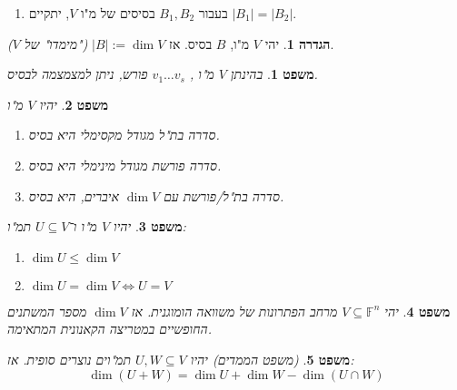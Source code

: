 \documentclass[]{article}
\newcommand\F         {\mathbb{F}}
\newtheorem{Theorem}{משפט}
\theoremstyle{definition}
\newtheorem{definition}{הגדרה}
\newcommand\theo  [1] {\begin{Theorem}#1\end{Theorem}}
\newcommand\defi  [1] {\begin{definition}#1\end{definition}}
\begin{document}
\begin{multicols}{2}
{\begin{enumerate}
			\item בעבור $B_1, B_2$ בסיסים של מ"ו $V$, יתקיים $|B_1| = |B_2|$. 
		\end{enumerate}} 
		\defi{יהי $V$ מ"ו, $B$ בסיס. אז $|B| := \dim V$ \textit{("מימדו" של $V$)}. }
		\theo{בהינתן $V$ מ"ו , $v_1 \dots v_s$ פורש, ניתן למצמצמה לבסיס. }
		\theo{יהיו $V$ מ"ו
		\begin{enumerate}
			\item סדרה בת"ל מגודל מקסימלי היא בסיס. 
			\item סדרה פורשת מגודל מינימלי היא בסיס. 
			\item סדרה בת"ל/פורשת עם $\dim V$ איברים, היא בסיס. 
		\end{enumerate}}
		\theo{יהיו $V$ מ"ו ו־$U\subseteq V$ תמ"ו: 
		\begin{enumerate}
			\item $\dim U \le \dim V$
			\item $\dim U = \dim V \iff U = V$
		\end{enumerate}}
		\theo{יהי $V \subseteq \F^n$ מרחב הפתרונות של משוואה הומוגנית. אז $\dim V$ מספר המשתנים החופשיים במטריצה הקאנונית המתאימה. }
		\theo{(משפט הממדים) יהיו $U, W \subseteq V$ תמ"וים נוצרים סופית. אז: 
		\[ \dim (U + W)  = \dim U + \dim W - \dim(U \cap W) \]}
		

\end{multicols}
\end{document}
